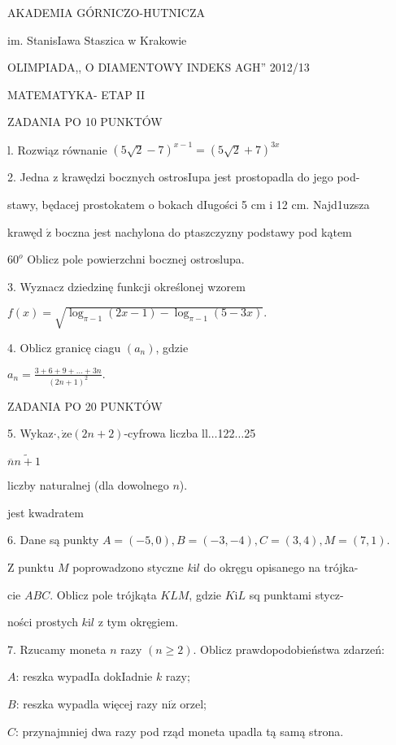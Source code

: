 \documentclass[a4paper,12pt]{article}
\begin{document}
AKADEMIA GÓRNICZO-HUTNICZA

im. StanisIawa Staszica w Krakowie

OLIMPIADA,, O DIAMENTOWY INDEKS AGH'' 2012/13

MATEMATYKA- ETAP II

ZADANIA PO 10 PUNKTÓW

l. Rozwiąz równanie $(5\sqrt{2}-7)^{x-1}=(5\sqrt{2}+7)^{3x}$

2. Jedna z krawędzi bocznych ostrosIupa jest prostopadla do jego pod-

stawy, będacej prostokatem o bokach dIugości 5 cm i 12 cm. Najd1uzsza

krawęd $\acute{\mathrm{z}}$ boczna jest nachylona do ptaszczyzny podstawy pod kątem

$60^{o}$ Oblicz pole powierzchni bocznej ostroslupa.

3. Wyznacz dziedzinę funkcji określonej wzorem

$f(x)=\sqrt{\log_{\pi-1}(2x-1)-\log_{\pi-1}(5-3x)}.$

4. Oblicz granicę ciagu $(a_{n})$, gdzie

$a_{n}=\displaystyle \frac{3+6+9+\ldots+3n}{(2n+1)^{2}}.$

ZADANIA PO 20 PUNKTÓW

5. Wykaz$\cdot, \dot{\mathrm{z}}\mathrm{e}(2n+2)$-cyfrowa liczba ll$\ldots$122$\ldots$25

$\overline{n}\tilde{n+1}$

liczby naturalnej (dla dowolnego $n$).

jest kwadratem

6. Dane są punkty $A = (-5,0), B = (-3,-4), C = (3,4), M = (7,1).$

$\mathrm{Z}$ punktu $M$ poprowadzono styczne $k\mathrm{i}l$ do okręgu opisanego na trójka-

cie $ABC$. Oblicz pole trójkąta $KLM$, gdzie $K\mathrm{i}L$ sq punktami stycz-

ności prostych $k\mathrm{i}l$ z tym okręgiem.

7. Rzucamy moneta $n$ razy $(n\geq 2)$. Oblicz prawdopodobieństwa zdarzeń:

$A$: reszka wypadIa dokIadnie $k$ razy;

$B$: reszka wypadla więcej razy $\mathrm{n}\mathrm{i}\dot{\mathrm{z}}$ orzel;

$C$: przynajmniej dwa razy pod rząd moneta upadla tą samą strona.
\end{document}
